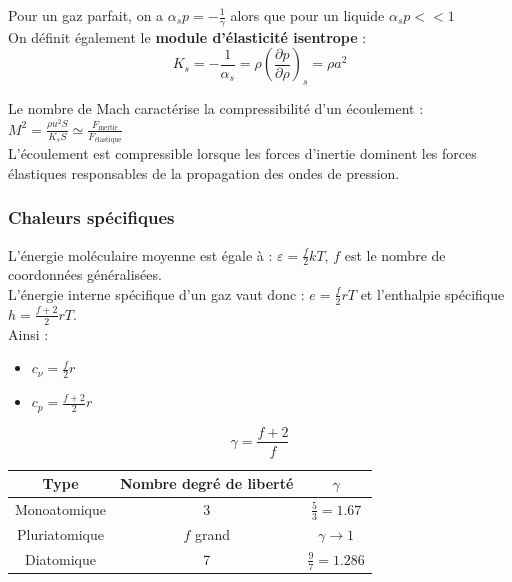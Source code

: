 \documentclass[../main.tex]{subfiles}
\begin{document}
Pour un gaz parfait, on a $\alpha_s p = -\frac{1}{\gamma}$ alors que pour un liquide $\alpha_s p<<1$\\

On définit également le \textbf{module d'élasticité isentrope} : \begin{equation}
    K_s = -\frac{1}{\alpha_s} = \rho (\frac{\partial p}{\partial \rho})_s = \rho a^2
\end{equation}

Le nombre de Mach caractérise la compressibilité d'un écoulement : $M^2 = \frac{\rho u^2 S}{K_s S} \simeq \frac{F_{\text{inertie}}}{F_{\text{élastique}}}$\\

L'écoulement est compressible lorsque les forces d'inertie dominent les forces élastiques responsables de la propagation des ondes de pression.\\

\subsubsection{Chaleurs spécifiques}

L'énergie moléculaire moyenne est égale à : $\varepsilon = \frac{f}{2}kT$, $f$ est le nombre de coordonnées généralisées.\\

L'énergie interne spécifique d'un gaz vaut donc : $e = \frac{f}{2}rT$ et l'enthalpie spécifique $h = \frac{f+2}{2}rT$.\\

Ainsi : \begin{itemize}
    \item $c_\nu = \frac{f}{2}r$\\
    \item $c_p = \frac{f+2}{2}r$\\
\end{itemize}

\begin{equation}
    \gamma = \frac{f+2}{f}
\end{equation}

\begin{table}[hbt!]
    \centering
    \begin{tabular}{c|c|c}
        Type & Nombre degré de liberté & $\gamma$ \\
        \hline
        Monoatomique & 3 & $\frac{5}{3} = 1.67$\\
        Pluriatomique & $f$ grand & $\gamma \rightarrow 1$\\
        Diatomique & 7 & $\frac{9}{7} = 1.286$\\
    \end{tabular}
\end{table}
\end{document}
